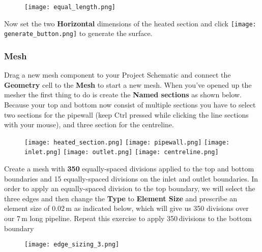 \documentclass[11pt,a4paper,oneside]{scrartcl}
\newcommand\bfr[1]{\textcolor[rgb]{1,0.00,0.00}{\textbf{\textsf{#1}}}}
\begin{document}
\begin{figure}[H]
\begin{center}
    \texttt{[image: equal\_length.png]}
\end{center}
\end{figure}

Now set the two \bfr{Horizontal} dimensions of the heated section and click \texttt{[image: generate\_button.png]} to generate the surface.

\subsubsection*{Mesh}
Drag a new mesh component to your Project Schematic and connect the \bfr{Geometry} cell to the \bfr{Mesh} to start a new mesh. When you've opened up the mesher the first thing to do is create the \bfr{Named sections} as shown below. Because your top and bottom now consist of multiple sections you have to select two sections for the pipewall (keep Ctrl pressed while clicking the line sections with your mouse), and three section for the centreline.

\begin{figure}[H]
\begin{center}
    \texttt{[image: heated\_section.png]}
    \texttt{[image: pipewall.png]}
    \texttt{[image: inlet.png]}
    \texttt{[image: outlet.png]}
    \texttt{[image: centreline.png]}
\end{center}
\end{figure}

Create a mesh with \bfr{350} equally-spaced divisions applied to the top and bottom boundaries and 15 equally-spaced divisions on the inlet and outlet boundaries. In order to apply an equally-spaced division to the top boundary, we will select the three edges and then change the \bfr{Type} to \bfr{Element Size} and prescribe an element size of 0.02\,m as indicated below, which will give us 350 divisions over our 7\,m long pipeline. Repeat this exercise to apply 350\,divisions to the bottom boundary

\begin{figure}[H]
\begin{center}
    \texttt{[image: edge\_sizing\_3.png]}
\end{center}
\end{figure}
\end{document}
